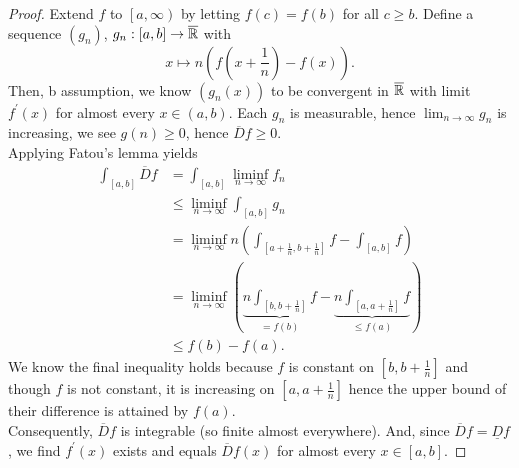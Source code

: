 \begin{proof}
	Extend \(f\) to \(\left[ a, \infty \right) \) by letting \(f\left( c \right) = f\left( b \right) \) for all \(c \ge b\). Define a sequence \(\left( g_{n} \right) \), \(g_{n}: \left[ a, b \right] \to \overline{\mathbb{R}}\) with \[
		x \mapsto n\left( f\left( x + \frac{1}{n} \right) - f\left( x \right)  \right)
	.\]
	Then, b assumption, we know \(\left( g_{n}\left( x \right)  \right) \) to be convergent in \(\overline{\mathbb{R}}\) with limit \(f^{\prime}\left( x \right) \)  for almost every \(x \in \left( a, b \right) \). Each \(g_{n}\) is measurable, hence \(\lim_{n \to \infty}g_{n}\) is increasing, we see \(g\left( n \right) \ge 0\), hence \(\overline{D}f \ge 0\).\\
	Applying Fatou's lemma yields
	\begin{align*}
		\int_{\left[ a, b \right] }\overline{D}f &=  \int_{\left[ a, b \right] }\liminf_{n \to \infty} f_{n} \\
							 &\le \liminf_{n \to \infty} \int_{\left[ a, b \right] }g_{n} \\
							 &= \liminf_{n \to \infty} n \left( \int_{\left[ a + \frac{1}{n}, b + \frac{1}{n} \right] }f - \int_{\left[ a, b \right] }f \right)  \\
							 &= \liminf_{n \to \infty} \left( \underbrace{n\int_{\left[b, b+\frac{1}{n}\right]}f}_{= f\left( b \right) }  - \underbrace{n\int _{\left[ a, a + \frac{1}{n} \right] } f}_{\le f\left( a \right) } \right)   \\
							 &\le f\left( b \right) - f\left( a \right)
	.\end{align*}
	We know the final inequality holds because \(f\) is constant on \(\left[ b, b + \frac{1}{n} \right] \) and though \(f\) is not constant, it is increasing on \(\left[ a, a + \frac{1}{n} \right] \) hence the upper bound of their difference is attained by \(f\left( a \right) \).\\
	Consequently, \(\overline{D} f\) is integrable (so finite almost everywhere). And, since \(\overline{D}f = \underline{D}f\) , we find \(f^{\prime}\left( x \right) \) exists and equals \(\overline{D}f\left( x \right) \) for almost every \(x \in \left[ a, b \right] \).
\end{proof}
